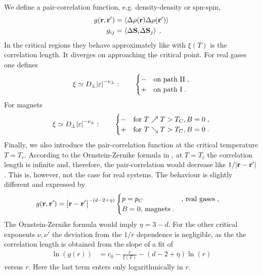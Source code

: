 \begin{enumerate}
We define a pair-correlation function, e.g. density-density or spn-spin,
%
\begin{align}
g(\mathbf r,\mathbf r') &= \left\langle\Delta \rho(\mathbf r) \Delta \rho(\mathbf r')\right\rangle\\
g_{ij} &= \left\langle\Delta \mathbf S_{i} \Delta \mathbf S_{j}\right\rangle\;.
\end{align}
%
In the critical regions they behave approximately like
%
%
with $\xi(T)$ is the correlation length.
It diverges on approaching the critical point.
For real gases one defines
%
\begin{align}\label{eq:}
\xi\simeq D_{\pm} \abs{\varepsilon}^{-\nu_{\pm}}
:\qquad \begin{cases}
-&\text{on path II}\;,\\
+&\text{on path I}\;.
\end{cases}
\end{align}
%
For magnets
\begin{align}\label{eq:}
\xi\simeq D_{\pm} \abs{\varepsilon}^{-\nu_{\pm}}
:\qquad
\begin{cases}
-	&\text{for }	T\nearrow T>T_{C}, B=0	\;,\\
+			&\text{for }	T\searrow T>T_{C}, B=0	\;.
\end{cases}
\end{align}
%
%
Finally, we also introduce the  pair-correlation function at the critical temperature $T=T_{c}$. According to the Ornstein-Zernike formula
in , at $T=T_{c}$ the correlation length is infinite and, therefore, the pair-correlation would decrease like
$1/\abs{\mathbf r-\mathbf r'}$. This is, however, not the case for real systems.
The behaviour is slightly different and expressed by
%
\begin{align*}
g(\mathbf r,\mathbf r') &=\big|\mathbf r-\mathbf r'\big|^{-(d-2+\eta)}
\begin{cases}
p=p_{C}  &\text{, real gases}\;,\\
B=0\text{, magnets}\;.
\end{cases}
\end{align*}
%
The Ornstein-Zernike formula would imply $\eta = 3-d$. For the other critical exponents $\nu,\nu'$ the deviation  from the $1/r$ dependence is negligible, as the the correlation length is obtained
from the slope of a fit of 
%
\begin{align*}
\ln(g(r)) &= c_{0} -\frac{r}{\xi(T)} - (d-2+\eta)\ln(r)
\end{align*}
%
versus $r$. Here the last term enters only logarithmically in $r$.




\end{enumerate}



